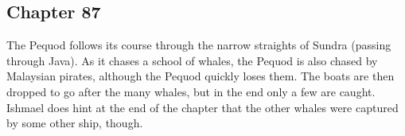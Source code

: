 \subsection{Chapter 87}

The Pequod follows its course through the narrow straights of Sundra (passing
through Java). As it chases a school of whales, the Pequod is also chased by
Malaysian pirates, although the Pequod quickly loses them. The boats are then
dropped to go after the many whales, but in the end only a few are caught.
Ishmael does hint at the end of the chapter that the other whales were captured
by some other ship, though.
